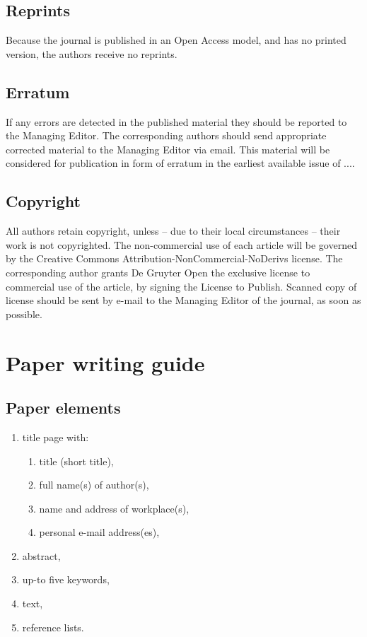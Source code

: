 \documentclass[USenglish,oneside,twocolumn]{article}
\begin{document}
\subsection{Reprints}

Because the journal is published in an Open Access model, and has no printed version, the authors receive no reprints.

\subsection{Erratum}

If any errors are detected in the published material they should be reported to the Managing Editor. The corresponding authors should send appropriate corrected material to the Managing Editor via email. This material will be considered for publication in form of erratum in the earliest available issue of ....

\subsection{Copyright  }

All authors retain copyright, unless -- due to their local circumstances -- their work is not copyrighted. The non-commercial use of each article will be governed by the Creative Commons Attribution-NonCommercial-NoDerivs license. The corresponding author grants De Gruyter Open the exclusive license to commercial use of the article, by signing the License to Publish. Scanned copy of license should be sent by e-mail to the Managing Editor of the journal, as soon as possible.


\section{Paper writing guide}

\subsection{Paper elements}

\begin{enumerate}
    \item title page with:
          \begin{enumerate}
              \item title (short title),
              \item full name(s) of author(s),
              \item name and address of workplace(s),
              \item personal e-mail address(es),
          \end{enumerate}
    \item abstract,
    \item up-to five keywords,
    \item text,
    \item reference lists.
\end{enumerate}
\end{document}
